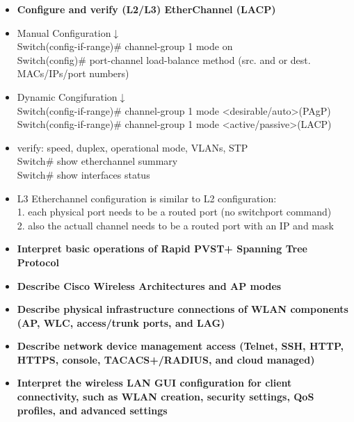 \documentclass{article}
\begin{document}
\begin{itemize}
  \item \textbf{Configure and verify (L2/L3) EtherChannel (LACP)}
	\item[] Manual Configuration$\downarrow$\\
		Switch(config-if-range)\# channel-group 1 mode on\\
		Switch(config)\# port-channel load-balance method (src. and or dest. MACs/IPs/port numbers)
	\item[] Dynamic Congifuration$\downarrow$\\
		Switch(config-if-range)\# channel-group 1 mode \textless desirable/auto\textgreater (PAgP)\\
		Switch(config-if-range)\# channel-group 1 mode \textless active/passive\textgreater (LACP)
	\item[] verify: speed, duplex, operational mode, VLANs, STP\\
		Switch\# show etherchannel summary\\
		Switch\# show interfaces status
	\item[] L3 Etherchannel configuration is similar to L2 configuration:\\
		1. each physical port needs to be a routed port (no switchport command)\\
		2. also the actuall channel needs to be a routed port with an IP and mask\\
  \item \textbf{Interpret basic operations of Rapid PVST+ Spanning Tree Protocol}
  \item \textbf{Describe Cisco Wireless Architectures and AP modes}
  \item \textbf{Describe physical infrastructure connections of WLAN components (AP, WLC, access/trunk ports, and LAG)}
  \item \textbf{Describe network device management access (Telnet, SSH, HTTP, HTTPS, console, TACACS+/RADIUS, and cloud managed)}
  \item \textbf{Interpret the wireless LAN GUI configuration for client connectivity, such as WLAN creation, security settings, QoS profiles, and advanced settings}\\
\end{itemize}
\end{document}
